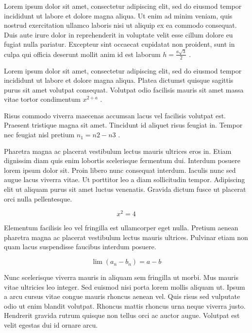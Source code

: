 \documentclass{article}
\begin{document}
	
   Lorem ipsum dolor sit amet, consectetur adipiscing elit, sed do eiusmod tempor incididunt ut labore et dolore magna aliqua. Ut enim ad minim veniam, quis nostrud exercitation ullamco laboris nisi ut aliquip ex ea commodo consequat. Duis aute irure dolor in reprehenderit in voluptate velit esse cillum dolore eu fugiat nulla pariatur. Excepteur sint occaecat cupidatat non proident, sunt in culpa qui officia deserunt mollit anim id est laborum 
   \begin{math}
    h=\frac{a\sqrt{3}}{2}
    \end{math}
    .
    \newline
    
    
    Lorem ipsum dolor sit amet, consectetur adipiscing elit, sed do eiusmod tempor incididunt ut labore et dolore magna aliqua. Platea dictumst quisque sagittis purus sit amet volutpat consequat. Volutpat odio facilisis mauris sit amet massa vitae tortor condimentum
    $ x^{2+a} $
    .
    \newline
    
    Risus commodo viverra maecenas accumsan lacus vel facilisis volutpat est. Praesent tristique magna sit amet. Tincidunt id aliquet risus feugiat in. Tempor nec feugiat nisl pretium 
    \( n_{1}={n{2}-n{3}} \)
    .
    \newline
    
    Pharetra magna ac placerat vestibulum lectus mauris ultrices eros in. Etiam dignissim diam quis enim lobortis scelerisque fermentum dui. Interdum posuere lorem ipsum dolor sit. Proin libero nunc consequat interdum. Iaculis nunc sed augue lacus viverra vitae. Ut porttitor leo a diam sollicitudin tempor. Adipiscing elit ut aliquam purus sit amet luctus venenatis. Gravida dictum fusce ut placerat orci nulla pellentesque.
    
    \[ x^2=4  \]
    
    Elementum facilisis leo vel fringilla est ullamcorper eget nulla. Pretium aenean pharetra magna ac placerat vestibulum lectus mauris ultrices. Pulvinar etiam non quam lacus suspendisse faucibus interdum posuere. 
    
    $$ \lim\left ( a_n-b_n \right )=a-b $$
    
    Nunc scelerisque viverra mauris in aliquam sem fringilla ut morbi. Mus mauris vitae ultricies leo integer. Sed euismod nisi porta lorem mollis aliquam ut. Ipsum a arcu cursus vitae congue mauris rhoncus aenean vel. Quis risus sed vulputate odio ut enim blandit volutpat. Rhoncus mattis rhoncus urna neque viverra justo. Hendrerit gravida rutrum quisque non tellus orci ac auctor augue. Volutpat est velit egestas dui id ornare arcu. 
    
\end{document}
